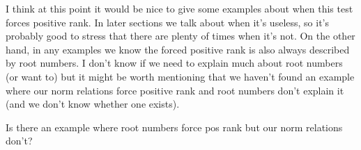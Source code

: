 {\color{red} I think at this point it would be nice to give some examples about when this test forces positive rank. In later sections we talk about when it's useless, so it's probably good to stress that there are plenty of times when it's not. On the other hand, in any examples we know the forced positive rank is also always described by root numbers. I don't know if we need to explain much about root numbers (or want to) but it might be worth mentioning that we haven't found an example where our norm relations force positive rank and root numbers don't explain it (and we don't know whether one exists).

Is there an example where root numbers force pos rank but our norm relations don't?}
